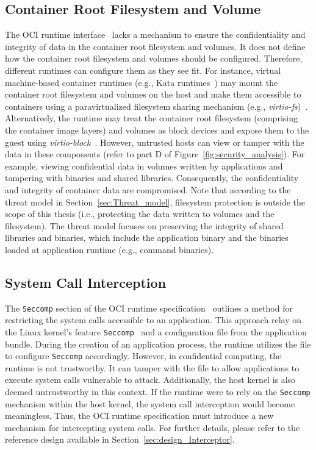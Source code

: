 \subsection{Container Root Filesystem and Volume}

The OCI runtime interface~\cite*{oci-runtime-spec} lacks a mechanism to ensure the confidentiality and integrity of data in the container root filesystem and volumes. It does not define how the container root filesystem and volumes should be configured. Therefore, different runtimes can configure them as they see fit. For instance, virtual machine-based container 
runtimes (e.g., Kata runtimes~\cite*{Kata-Containers}) may mount the container root filesystem and volumes on the host and make them accessible to containers using a paravirtualized filesystem sharing mechanism (e.g., \emph{virtio-fs})~\cite*{kata_storage}. Alternatively, the runtime may treat the container root filesystem (comprising the container image layers) and volumes as block devices and expose them to the guest 
using \emph{virtio-block}~\cite*{kata_storage}. However, untrusted hosts can view or tamper with the data in these components (refer to part D of Figure~\ref{fig:security_analysis}). For example, viewing confidential data in volumes written by applications and tampering with binaries and shared 
libraries. Consequently, the confidentiality and integrity of container data are compromised. Note that according to the threat model in Section~\ref{sec:Threat_model}, filesystem protection is outside the scope of this thesis (i.e., protecting the data written to volumes and the filesystem). The 
threat model focuses on preserving the integrity of shared libraries and binaries, which include the application binary and the binaries loaded at application runtime (e.g., command binaries).


\subsection{System Call Interception}
\label{sec:security_analyse_oci_system_call}
The \texttt{Seccomp} section of the OCI runtime specification~\cite*{oci-runtime-spec} outlines a method for restricting the system calls accessible to an application. This approach relay on the Linux kernel's feature \texttt{Seccomp}~\cite*{seccomp} and a configuration file from the application bundle. During the creation of an application process, the runtime 
utilizes the file to configure \texttt{Seccomp} accordingly. However, in confidential computing, the runtime is not trustworthy. It can tamper with the file to allow applications to execute system calls vulnerable to attack. Additionally, the host kernel is also deemed untrustworthy in this context. If the runtime were to rely on the \texttt{Seccomp} mechanism 
within the host kernel, the system call interception would become meaningless. Thus, the OCI runtime specification must introduce a new mechanism for intercepting system calls. For further details, please refer to the reference design available in Section~\ref{sec:design_Interceptor}.


